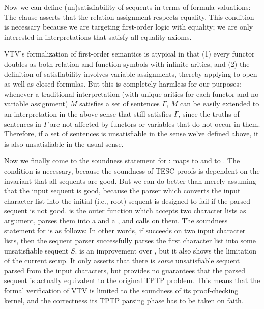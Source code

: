 \documentclass[12pt]{article}
\begin{document}
Now we can define (un)satisfiability of sequents in terms of formula valuations: 
The \AgdaSpace{} clause asserts that the
relation assignment  respects equality. This condition is necessary
because we are targeting first-order logic with equality; we are only 
interested in interpretations that satisfy all equality axioms.

VTV's formalization of first-order semantics is atypical in that (1) every functor
doubles as both relation and function symbols with infinite arities, and 
(2) the definition of satisfiability involves variable assignments, thereby applying to
open as well as closed formulas. But this is completely harmless for our purposes:
whenever a traditional interpretation (with unique arities for each functor and no 
variable assignment) $M$ satisfies a set of sentences $\Gamma$, $M$ can be easily extended 
to an interpretation in the above sense that still satisfies $\Gamma$, since the 
truths of sentences in $\Gamma$ are not affected by functors or variables that do not 
occur in them. Therefore, if a set of sentences is unsatisfiable in the sense we've
defined above, it is also unsatisfiable in the usual sense. 

Now we finally come to the soundness statement for :
 \AgdaSymbol{:}    
maps  to  and  to .
The condition \AgdaSpace{} is necessary, because 
the soundness of TESC proofs is dependent on the invariant that all sequents are good. 
But we can do better than merely assuming that the input sequent is good,
because the parser which converts the input character list into the initial (i.e., root) 
sequent is designed to fail if the parsed sequent is not good. 
is the outer function which accepts two character lists as argument, parses them 
into a  and a , and calls 
on them. The soundness statement for  is as follows:
In other words, if  succeeds on two input character lists, 
then the sequent parser successfully parses the first character list into some unsatisfiable 
sequent $S$.  is an improvement over ,
but it also shows the limitation of the current setup. It only asserts that there is 
\textit{some} unsatisfiable sequent parsed from the input characters, 
but provides no guarantees that the parsed sequent is actually equivalent to the original
TPTP problem. This means that the formal verification of VTV is limited to the soundness 
of its proof-checking kernel, and the correctness its TPTP parsing phase has to be 
taken on faith.
\end{document}
